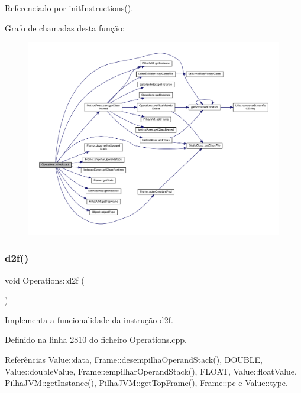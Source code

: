 Referenciado por init\+Instructions().

Grafo de chamadas desta função\+:\nopagebreak
\begin{figure}[H]
\begin{center}
\leavevmode
\includegraphics[width=350pt]{classOperations_aa4f0f3c8617af197e4a4e2dc62cb9c35_cgraph}
\end{center}
\end{figure}
\mbox{\label{classOperations_ab5a2d770d297ace1ec0e40d3fed9f0e3}} 
\subsubsection{\texorpdfstring{d2f()}{d2f()}}
{\footnotesize\ttfamily void Operations\+::d2f (\begin{DoxyParamCaption}{ }\end{DoxyParamCaption})\hspace{0.3cm}{\ttfamily [private]}}



Implementa a funcionalidade da instrução d2f. 



Definido na linha 2810 do ficheiro Operations.\+cpp.



Referências Value\+::data, Frame\+::desempilha\+Operand\+Stack(), D\+O\+U\+B\+LE, Value\+::double\+Value, Frame\+::empilhar\+Operand\+Stack(), F\+L\+O\+AT, Value\+::float\+Value, Pilha\+J\+V\+M\+::get\+Instance(), Pilha\+J\+V\+M\+::get\+Top\+Frame(), Frame\+::pc e Value\+::type.



